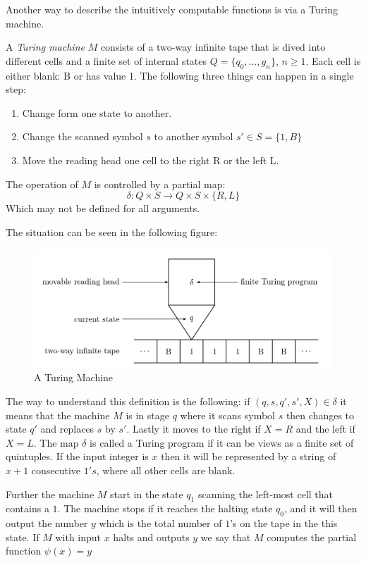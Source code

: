 \documentclass[../main.tex]{subfiles}
\begin{document}
Another way to describe the intuitively computable functions is via a Turing
machine. 
\begin{defi}
	A \textit{Turing machine} $M$ consists of a two-way infinite tape that
	is dived into different cells and a finite set of internal states $Q=\{
	q_0,\ldots, g_n\}$, $n\geq 1$. Each cell  is either blank: B or has
	value 1.
	The following three things can happen in a single
	step:
	\begin{enumerate}
		\item Change form one state to another.
		\item Change the scanned symbol $s$ to another symbol
			$s'\in S=\{1,B\}$
		\item Move the reading head one cell to the right R or the left
			L.
	\end{enumerate}
	The operation of $M$ is controlled by a partial map:
	$$\delta:Q\times S\rightarrow Q\times S\times\{R,L\}$$
	Which may not be defined for all arguments.
\end{defi}
The situation can be seen in the following figure:
\begin{center}
	\begin{figure}[h]
\includegraphics[width=\textwidth]{Turnig.png}
\caption{A Turing Machine}
\end{figure}
\end{center}

The way to understand this definition is the following: if
$(q,s,q',s',X)\in\delta$ it means that the machine $M$ is in stage $q$ where it
scans symbol $s$ then changes to state $q'$ and replaces $s$ by $s'$. Lastly it
moves to the right if $X=R$ and the left if $X=L$. The map $\delta$ is called a
Turing program if it can be views as a finite set of quintuples. If the input
integer is $x$ then it will be represented by a string of $x+1$ consecutive
$1's$, where all other cells are blank.

Further the machine $M$ start in the state $q_1$ scanning the left-most cell
that contains a $1$. The machine stops if it reaches the halting state $q_0$,
and it will then output the number $y$ which is the total number of $1$'s on
the tape in the this state. If $M$ with input $x$ halts and outputs $y$ we
say that $M$ computes the partial function $\psi(x)=y$
\end{document}
